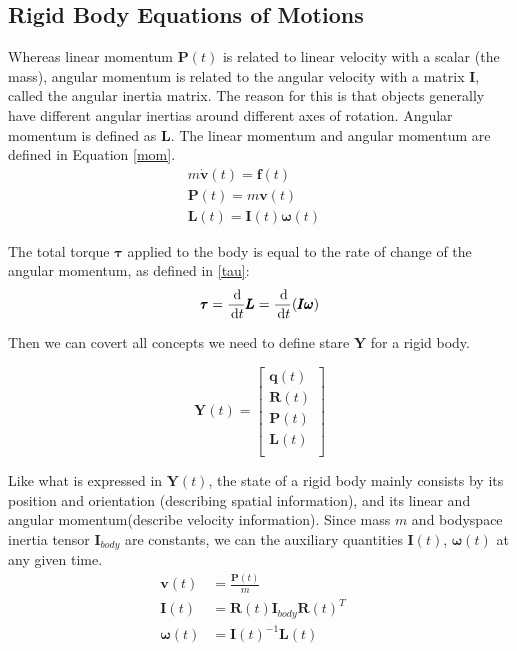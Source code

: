 \subsection{Rigid Body Equations of Motions}
\label{sec:rigid_rm}
 Whereas linear momentum $\pmb{P}(t)$ is related to linear velocity with a scalar (the mass), angular momentum is related to the angular velocity with a matrix \(\pmb{I}\), called the angular inertia matrix. The reason for this is that objects generally have different angular inertias around different axes of rotation. Angular momentum is defined as \(\pmb{L}\). The linear momentum and angular momentum are defined in Equation \ref{mom}.
\begin{subequations}
\begin{align}
    m \dot{\pmb{v}}(t) = \pmb{f}(t) & \\
    \pmb{P}(t) = m \pmb{v} (t)  & \\
    \pmb{L}(t) = \pmb{I}(t)\pmb{\omega}(t) & 
\end{align}
\label{mom}
\end{subequations}

The total torque $\pmb{\tau}$ applied to the body is equal to the rate of change of the angular momentum, as defined in \ref{tau}:
\begin{equation}
    \pmb{\tau} = \frac{\,\mathrm{d}}{\,\mathrm{d} t }\pmb{L} = \frac{\,\mathrm{d}}{\,\mathrm{d} t }(\pmb{I}\pmb{\omega})
    \label{tau}
\end{equation}

 Then we can covert all concepts we need to define stare $\textbf{Y}$ for a rigid body.

\begin{equation}
    \textbf{Y}(t) = \left[
        \begin{array}{c}
            \pmb{q}(t) \\
            \pmb{R}(t) \\
            \pmb{P}(t) \\
            \pmb{L}(t) \\
        \end{array}
    \right]
\end{equation}

Like what is expressed in $\textbf{Y}(t)$, the state of a rigid body mainly consists by its position and orientation (describing spatial information), and its linear and angular momentum(describe velocity information). Since mass $m$ and bodyspace inertia tensor $\pmb{I}_{body}$ are constants, we can the auxiliary quantities $\pmb{I}(t)$, $\pmb{\omega}(t)$ at any given time.
\begin{subequations}
\begin{align}
    \pmb{v}(t) & = \frac{\pmb{P}(t)}{m} \quad \\
    \pmb{I}(t) & = \pmb{R}(t)\pmb{I}_{body}\pmb{R}(t)^{T} \quad \\
    \pmb{\omega}(t) & = \pmb{I}(t)^{-1}\pmb{L}(t) 
\end{align}
\end{subequations}

